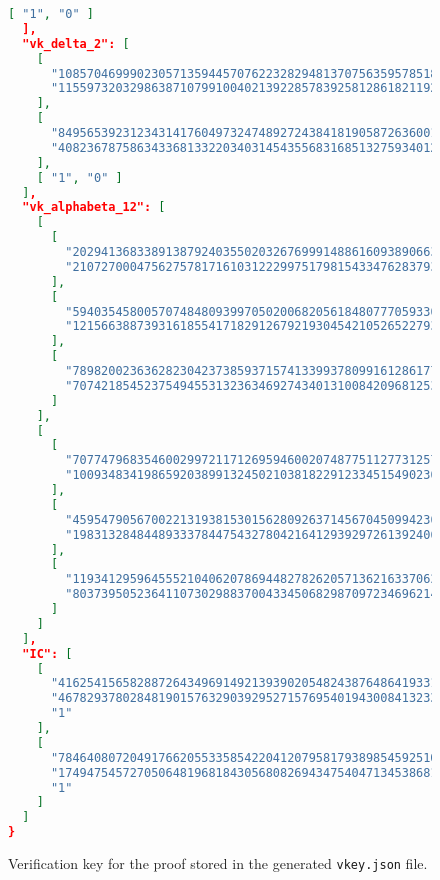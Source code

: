 \documentclass[../lecture-notes.tex]{subfiles}
\begin{document}
\begin{figure}
\begin{center}
\begin{tcolorbox}
\begin{lstlisting}[language=JSON,numbers=none,basicstyle=\footnotesize\ttfamily\tiny]
    [ "1", "0" ]
  ],
  "vk_delta_2": [
    [
      "10857046999023057135944570762232829481370756359578518086990519993285655852781",
      "11559732032986387107991004021392285783925812861821192530917403151452391805634"
    ],
    [
      "8495653923123431417604973247489272438418190587263600148770280649306958101930",
      "4082367875863433681332203403145435568316851327593401208105741076214120093531"
    ],
    [ "1", "0" ]
  ],
  "vk_alphabeta_12": [
    [
      [
        "2029413683389138792403550203267699914886160938906632433982220835551125967885",
        "21072700047562757817161031222997517981543347628379360635925549008442030252106"
      ],
      [
        "5940354580057074848093997050200682056184807770593307860589430076672439820312",
        "12156638873931618554171829126792193045421052652279363021382169897324752428276"
      ],
      [
        "7898200236362823042373859371574133993780991612861777490112507062703164551277",
        "7074218545237549455313236346927434013100842096812539264420499035217050630853"
      ]
    ],
    [
      [
        "7077479683546002997211712695946002074877511277312570035766170199895071832130",
        "10093483419865920389913245021038182291233451549023025229112148274109565435465"
      ],
      [
        "4595479056700221319381530156280926371456704509942304414423590385166031118820",
        "19831328484489333784475432780421641293929726139240675179672856274388269393268"
      ],
      [
        "11934129596455521040620786944827826205713621633706285934057045369193958244500",
        "8037395052364110730298837004334506829870972346962140206007064471173334027475"
      ]
    ]
  ],
  "IC": [
    [
      "4162541565828872643496914921393902054824387648641933177665940781539334781623",
      "4678293780284819015763290392952715769540194300841323348855962545628746384938",
      "1"
    ],
    [
      "7846408072049176620553358542204120795817938985459251067840222635524693287955",
      "17494754572705064819681843056808269434754047134538681907566256240907807975850",
      "1"
    ]
  ]
}
                \end{lstlisting}
            \end{tcolorbox}
        \end{center}
        \caption{Verification key for the proof stored in the generated \texttt{vkey.json} file.}
        \label{fig:vkey-json}
    \end{figure}
\end{document}
